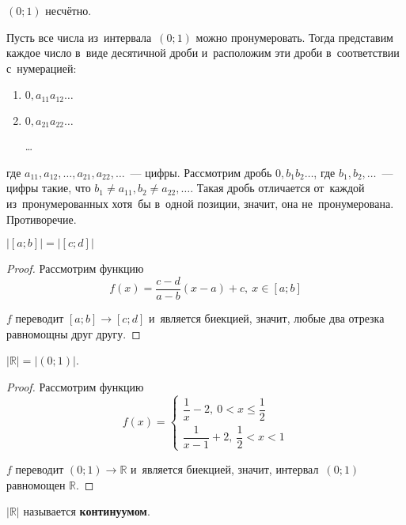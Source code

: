 \begin{statement}
$(0; 1)$ несчётно.
\end{statement}
\begin{proofcontra}
Пусть все числа из~интервала~$(0; 1)$ можно пронумеровать.
Тогда представим каждое число в~виде десятичной дроби и~расположим эти дроби в~соответствии с~нумерацией:
\begin{enumerate}
	\item $0{,}a_{11}a_{12} \ldots$
	\item $0{,}a_{21}a_{22} \ldots$
	
	\ldots
\end{enumerate}
где $a_{11}, a_{12}, \ldots, a_{21}, a_{22}, \ldots$~--- цифры.
Рассмотрим дробь $0{,}b_1 b_2 \ldots$, где $b_1, b_2, \ldots$~--- цифры такие, что $b_1 \neq a_{11}, b_2 \neq a_{22}, \ldots$.
Такая дробь отличается от~каждой из~пронумерованных хотя~бы в~одной позиции, значит, она не~пронумерована.
Противоречие.
\end{proofcontra}

\begin{statement}
$|[a; b]| = |[c; d]|$
\end{statement}
\begin{proof}
Рассмотрим функцию
\begin{equation*}
f(x) = \frac{c - d}{a - b} (x - a) + c, \ x \in [a; b]
\end{equation*}

$f$ переводит $[a; b] \to [c; d]$ и~является биекцией, значит, любые два отрезка равномощны друг другу.
\end{proof}

\begin{statement}
$|\mathbb R| = |(0; 1)|$.
\end{statement}
\begin{proof}
Рассмотрим функцию
\begin{equation*}
f(x) =
\begin{cases}
\dfrac1x - 2, \ 0 < x \leqslant \dfrac12 \\
\dfrac1{x - 1} + 2, \ \dfrac12 < x < 1
\end{cases}
\end{equation*}

$f$ переводит $(0; 1) \to \mathbb R$ и~является биекцией, значит, интервал~$(0; 1)$ равномощен $\mathbb R$.
\end{proof}

$|\mathbb R|$ называется \textbf{континуумом}.